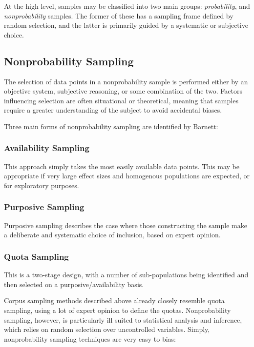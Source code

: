 At the high level, samples may be classified into two main groups: \textsl{probability}, and \textsl{nonprobability} samples.  The former of these has a sampling frame defined by random selection, and the latter is primarily guided by a systematic or subjective choice.

\subsection{Nonprobability Sampling}
The selection of data points in a nonprobability sample is performed either by an objective system, subjective reasoning, or some combination of the two.  Factors influencing selection are often situational or theoretical, meaning that samples require a greater understanding of the subject to avoid accidental biases.  


Three main forms of nonprobability sampling are identified by Barnett\cite{barnett1991sample}:

\subsubsection{Availability Sampling}
This approach simply takes the most easily available data points.  This may be appropriate if very large effect sizes and homogenous populations are expected, or for exploratory purposes.
\subsubsection{Purposive Sampling}
Purposive sampling describes the case where those constructing the sample make a deliberate and systematic choice of inclusion, based on expert opinion.
\subsubsection{Quota Sampling}
This is a two-stage design, with a number of sub-populations being identified and then selected on a purposive/availability basis.


Corpus sampling methods described above already closely resemble quota sampling, using a lot of expert opinion to define the quotas.  Nonprobability sampling, however, is particularly ill suited to statistical analysis and inference, which relies on random selection over uncontrolled variables.  Simply, nonprobability sampling techniques are very easy to bias\cite[p.19]{barnett1991sample}:

